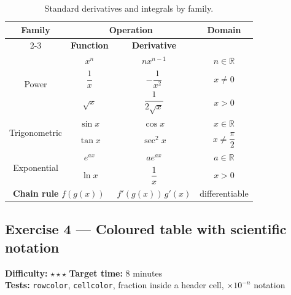\documentclass[11pt]{article}
\newcommand{\exinfo}[3]{%
  \par\noindent
  \colorbox{RoyalBlue!12}{\parbox{0.97\textwidth}{\small
  \textbf{Difficulty:} #1 \qquad \textbf{Target time:} #2 \\
  \textbf{Tests:} #3}}\par\medskip}
\begin{document}
\begin{table}[H]
\centering
\caption{Standard derivatives and integrals by family.}
\renewcommand{\arraystretch}{1.7}
\begin{tabular}{|c|c|c|c|}
\hline
\multirow{2}{*}{\textbf{Family}} &
  \multicolumn{2}{c|}{\textbf{Operation}} &
  \multirow{2}{*}{\textbf{Domain}} \\
\cline{2-3}
 & \textbf{Function} & \textbf{Derivative} & \\
\hline
\multirow{3}{*}{Power}
  & $x^n$              & $n x^{n-1}$                 & $n \in \mathbb{R}$ \\ \cline{2-4}
  & $\dfrac{1}{x}$     & $-\dfrac{1}{x^2}$           & $x \neq 0$ \\ \cline{2-4}
  & $\sqrt{x}$         & $\dfrac{1}{2\sqrt{x}}$      & $x > 0$ \\
\hline
\multirow{2}{*}{Trigonometric}
  & $\sin x$           & $\cos x$                    & $x \in \mathbb{R}$ \\ \cline{2-4}
  & $\tan x$           & $\sec^2 x$                  & $x \neq \dfrac{\pi}{2}$ \\
\hline
\multirow{2}{*}{Exponential}
  & $e^{ax}$           & $a e^{ax}$                  & $a \in \mathbb{R}$ \\ \cline{2-4}
  & $\ln x$            & $\dfrac{1}{x}$              & $x > 0$ \\
\hline
\multicolumn{2}{|c|}{\textbf{Chain rule } $f(g(x))$}
  & $f'(g(x))\,g'(x)$  & differentiable \\
\hline
\end{tabular}
\end{table}

\newpage
\subsection*{Exercise 4 --- Coloured table with scientific notation}
\exinfo{$\star\star\star$}{8 minutes}{\texttt{rowcolor}, \texttt{cellcolor},
fraction inside a header cell, $\times 10^{-n}$ notation}
\end{document}
